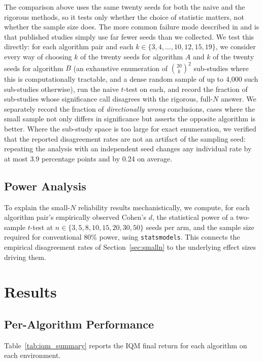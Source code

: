 \documentclass[journal]{IEEEtran}
\begin{document}
The comparison above uses the same twenty seeds for both the naive and the rigorous methods, so it
tests only whether the choice of statistic matters, not whether the sample size does. The more
common failure mode described in \cite{henderson2018deep} and \cite{colas2018many} is that
published studies simply use far fewer seeds than we collected. We test this directly: for each
algorithm pair and each $k \in \{3, 4, \ldots, 10, 12, 15, 19\}$, we consider every way of choosing
$k$ of the twenty seeds for algorithm $A$ and $k$ of the twenty seeds for algorithm $B$ (an
exhaustive enumeration of $\binom{20}{k}^2$ sub-studies where this is computationally tractable,
and a dense random sample of up to 4{,}000 such sub-studies otherwise), run the naive $t$-test on
each, and record the fraction of sub-studies whose significance call disagrees with the rigorous,
full-$N$ answer. We separately record the fraction of \emph{directionally wrong} conclusions, cases where the small
sample not only differs in significance but asserts the opposite algorithm is better. Where the
sub-study space is too large for exact enumeration, we verified that the reported disagreement
rates are not an artifact of the sampling seed: repeating the analysis with an independent seed
changes any individual rate by at most 3.9 percentage points and by 0.24 on average.

\subsection{Power Analysis}
\label{sec:power}

To explain the small-$N$ reliability results mechanistically, we compute, for each algorithm
pair's empirically observed Cohen's $d$, the statistical power of a two-sample $t$-test at $n \in
\{3, 5, 8, 10, 15, 20, 30, 50\}$ seeds per arm, and the sample size required for conventional 80\%
power, using \texttt{statsmodels}. This connects the empirical disagreement rates of
Section~\ref{sec:smalln} to the underlying effect sizes driving them.

\section{Results}

\subsection{Per-Algorithm Performance}

Table~\ref{tab:iqm_summary} reports the IQM final return for each algorithm on each environment.
\end{document}
